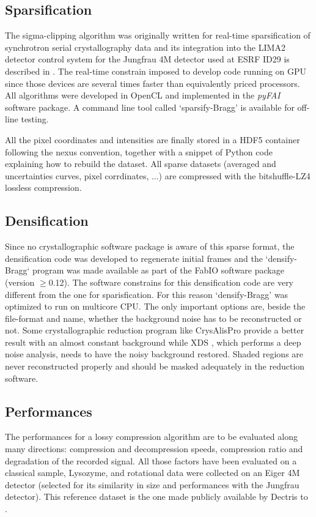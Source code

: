 \documentclass[preprint]{iucr}              %
\begin{document}
\subsection{Sparsification}

The sigma-clipping algorithm was originally written for real-time sparsification of synchrotron serial crystallography data and its integration into the LIMA2 \cite{lima2} detector control system for the Jungfrau 4M detector used at ESRF ID29 is described in \cite{sri2021}.
The real-time constrain imposed to develop code running on GPU since those devices are several times
faster than equivalently priced processors.
All algorithms were developed in OpenCL \cite{opencl_khronos} and implemented in the \textit{pyFAI} software package.
A command line tool called `sparsify-Bragg' is available for off-line testing.

All the pixel coordinates and intensities are finally stored in a HDF5 \cite{hdf5} container following the nexus \cite{nexus} convention, together with a snippet of Python code explaining how to rebuild the dataset.
All sparse datasets (averaged and uncertainties curves, pixel corrdinates, ...) are compressed with the bitshuffle-LZ4 \cite{bitshuffle} lossless compression.

\subsection{Densification}
Since no crystallographic software package is aware of this sparse format, the densification code was developed to regenerate initial frames and the `densify-Bragg` program was made available as part of the FabIO \cite{fabio} software package (version $\ge$0.12). 
The software constrains for this densification code are very different from the one for sparisfication. For this reason `densify-Bragg' was optimized to run on multicore CPU. 
The only important options are, beside the file-format and name, whether the background noise has to be reconstructed or not. 
Some crystallographic reduction program like CrysAlisPro \cite{crysalis} provide a better result with an almost constant background while XDS \cite{xds}, which performs a deep noise analysis, needs to have the noisy background restored. 
Shaded regions are never reconstructed properly and should be masked adequately in the reduction software.

\subsection{Performances}
The performances for a lossy compression algorithm are to be evaluated along many directions: compression and decompression speeds, compression ratio and degradation of the recorded signal.
All those factors have been evaluated on a classical sample, Lysozyme, and rotational data were collected on an Eiger 4M detector (selected for its similarity in size and performances with the Jungfrau detector). 
This reference dataset is the one made publicly available by Dectris to \cite{lysozym}. 
\end{document}
